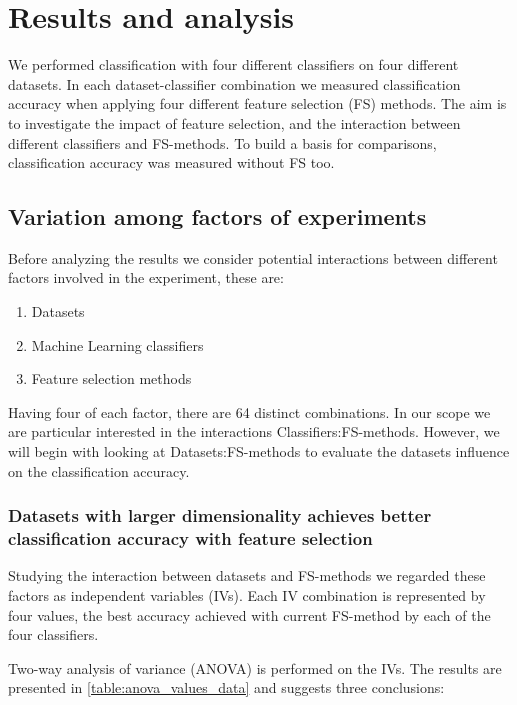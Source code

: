 \chapter{Results and analysis}

We performed classification with four different classifiers on four different datasets. In each dataset-classifier combination we measured classification accuracy when applying four different feature selection (FS) methods. The aim is to investigate the impact of feature selection, and the interaction between different classifiers and FS-methods. To build a basis for comparisons, classification accuracy was measured without FS too.

\section{Variation among factors of experiments}
\label{Variation_among_factors}

Before analyzing the results we consider potential interactions between different factors involved in the experiment, these are:

\begin{enumerate}
  \item Datasets
  \item Machine Learning classifiers
  \item Feature selection methods
\end{enumerate}

Having four of each factor, there are 64 distinct combinations. In our scope we are particular interested in the interactions Classifiers:FS-methods. However, we will begin with looking at Datasets:FS-methods to evaluate the datasets influence on the classification accuracy.

\subsection{Datasets with larger dimensionality achieves better classification accuracy with feature selection}

Studying the interaction between datasets and FS-methods we regarded these factors as independent variables (IVs). Each IV combination is represented by four values, the best accuracy achieved with current FS-method by each of the four classifiers.

Two-way analysis of variance (ANOVA) is performed on the IVs. The results are presented in \ref{table:anova_values_data} and suggests three conclusions:

